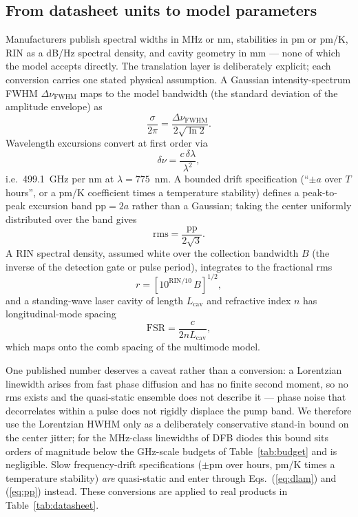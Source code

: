 \subsection{From datasheet units to model parameters}

Manufacturers publish spectral widths in MHz or nm, stabilities in pm
or pm/K, RIN as a dB/Hz spectral density, and cavity geometry in mm
--- none of which the model accepts directly. The translation layer is
deliberately explicit; each conversion carries one stated physical
assumption. A Gaussian intensity-spectrum FWHM
$\Delta\nu_{\mathrm{FWHM}}$ maps to the model bandwidth (the standard
deviation of the amplitude envelope) as
\begin{equation}
  \frac{\sigma}{2\pi} = \frac{\Delta\nu_{\mathrm{FWHM}}}{2\sqrt{\ln 2}} .
  \label{eq:fwhm}
\end{equation}
Wavelength excursions convert at first order via
\begin{equation}
  \delta\nu = \frac{c\,\delta\lambda}{\lambda^2} ,
  \label{eq:dlam}
\end{equation}
i.e.\ 499.1~GHz per nm at $\lambda = 775$~nm. A bounded drift
specification (``$\pm a$ over $T$ hours'', or a pm/K coefficient times
a temperature stability) defines a peak-to-peak excursion band
$\mathrm{pp} = 2a$ rather than a Gaussian; taking the center uniformly
distributed over the band gives
\begin{equation}
  \mathrm{rms} = \frac{\mathrm{pp}}{2\sqrt{3}} .
  \label{eq:pp}
\end{equation}
A RIN spectral density, assumed white over the collection bandwidth
$B$ (the inverse of the detection gate or pulse period), integrates to
the fractional rms
\begin{equation}
  r = \left[ 10^{\mathrm{RIN}/10}\, B \right]^{1/2} ,
  \label{eq:rinint}
\end{equation}
and a standing-wave laser cavity of length $L_{\mathrm{cav}}$ and
refractive index $n$ has longitudinal-mode spacing
\begin{equation}
  \mathrm{FSR} = \frac{c}{2 n L_{\mathrm{cav}}} ,
  \label{eq:fsr}
\end{equation}
which maps onto the comb spacing of the multimode model.

One published number deserves a caveat rather than a conversion: a
Lorentzian linewidth arises from fast phase diffusion and has no
finite second moment, so no rms exists and the quasi-static ensemble
does not describe it --- phase noise that decorrelates within a pulse
does not rigidly displace the pump band. We therefore use the
Lorentzian HWHM only as a deliberately conservative stand-in bound on
the center jitter; for the MHz-class linewidths of DFB diodes this
bound sits orders of magnitude below the GHz-scale budgets of
Table~\ref{tab:budget} and is negligible. Slow frequency-drift
specifications ($\pm$pm over hours, pm/K times a temperature
stability) \emph{are} quasi-static and enter through
Eqs.~(\ref{eq:dlam}) and (\ref{eq:pp}) instead. These conversions are
applied to real products in Table~\ref{tab:datasheet}.

